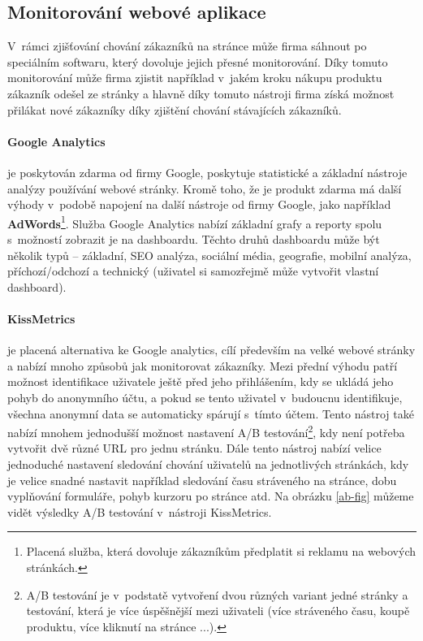 \subsection{Monitorování webové aplikace}
\par V~rámci zjišťování chování zákazníků na stránce může firma sáhnout po speciálním softwaru, který dovoluje jejich přesné monitorování. Díky tomuto monitorování může firma zjistit například v~jakém kroku nákupu produktu zákazník odešel ze stránky a hlavně díky tomuto nástroji firma získá možnost přilákat nové zákazníky díky zjištění chování stávajících zákazníků. \cite{the-ux-book}

\paragraph{Google Analytics} je poskytován zdarma od firmy Google, poskytuje statistické a základní nástroje analýzy používání webové stránky. Kromě toho, že je produkt zdarma má další výhody v~podobě napojení na další nástroje od firmy Google, jako například \textbf{AdWords}\footnote{Placená služba, která dovoluje zákazníkům předplatit si reklamu na webových stránkách.}. Služba Google Analytics nabízí základní grafy a reporty spolu s~možností zobrazit je na dashboardu. Těchto druhů dashboardu může být několik typů -- základní, SEO analýza, sociální média, geografie, mobilní analýza, příchozí/odchozí a technický (uživatel si samozřejmě může vytvořit vlastní dashboard).

\paragraph{KissMetrics} je placená alternativa ke Google analytics, cílí především na velké webové stránky a nabízí mnoho způsobů jak monitorovat zákazníky. Mezi přední výhodu patří možnost identifikace uživatele ještě před jeho přihlášením, kdy se ukládá jeho pohyb do anonymního účtu, a pokud se tento uživatel v~budoucnu identifikuje, všechna anonymní data se automaticky spárují s~tímto účtem. Tento nástroj také nabízí mnohem jednodušší možnost nastavení A/B testování\footnote{A/B testování je v~podstatě vytvoření dvou různých variant jedné stránky a testování, která je více úspěšnější mezi uživateli (více stráveného času, koupě produktu, více kliknutí na stránce ...).}, kdy není potřeba vytvořit dvě různé URL pro jednu stránku. Dále tento nástroj nabízí velice jednoduché nastavení sledování chování uživatelů na jednotlivých stránkách, kdy je velice snadné nastavit například sledování času stráveného na stránce, dobu vyplňování formuláře, pohyb kurzoru po stránce atd. Na obrázku \ref{ab-fig} můžeme vidět výsledky A/B testování v~nástroji KissMetrics.

